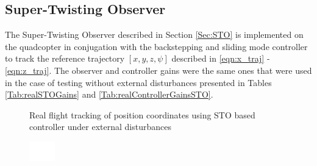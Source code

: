 \documentclass[letterpaper%
, twoside%
, 12pt%
,memoire%
, english%
,creativecommons,hyperref%
]{thETS}
\theoremstyle{newThmStyle}
\begin{document}
\subsection{Super-Twisting Observer}
The Super-Twisting Observer described in Section \ref{Sec:STO} is implemented on the quadcopter in conjugation with the backstepping and sliding mode controller to track the reference trajectory $[x,y,z,\psi]$ described in \eqref{eqn:x_traj} - \eqref{eqn:z_traj}. The observer and controller gains were the same ones that were used in the case of testing without external disturbances presented in Tables \ref{Tab:realSTOGains} and \ref{Tab:realControllerGainsSTO}. 

\begin{figure}[H]
	\centering
	\parbox{0.75\textwidth}{\caption{Real flight tracking of position coordinates using STO based controller under external disturbances\label{Fig:xyztracSTODist}}}
\end{figure}
\begin{figure}[H]
	\includegraphics[width=0.1\textwidth]{Figures/blank.png}
\end{figure}
\end{document}
